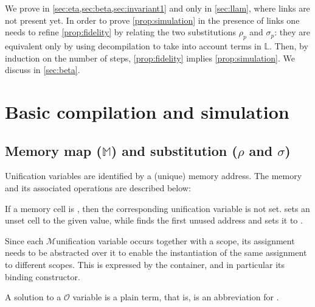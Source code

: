 \documentclass[sigconf,natbib=false,review]{acmart}
\newcommand{\Fo}{\texorpdfstring{\ensuremath{\mathcal{O}\xspace}}{O}} %
\newcommand{\Ho}{\texorpdfstring{\ensuremath{\mathcal{M}}\xspace}{M}}
\newcommand{\linkStore}{\texorpdfstring{\ensuremath{\mathbb{L}}\xspace}{L}}
\newcommand{\mapStore}{\texorpdfstring{\ensuremath{\mathbb{M}}\xspace}{M}}
\begin{document}
We prove  in
\cref{sec:eta,sec:beta,sec:invariant1}
and  only in \cref{sec:llam},
where links are not present yet.
In order to prove \cref{prop:simulation} in the presence of links
one needs to refine \cref{prop:fidelity} by relating the two
substitutions $\rho_p$ and $\sigma_p$: they are equivalent only by using decompilation to 
take into account terms in \linkStore.
Then, by induction
on the number of steps, \cref{prop:fidelity} implies \cref{prop:simulation}.
We discuss  in \cref{sec:beta}.


\section{Basic compilation and simulation}
\label{sec:simulation}


\subsection{Memory map (\mapStore) and substitution (\texorpdfstring{$\rho$ and $\sigma$}{rho and sigma})}
\label{sec:grounwork}


% 

Unification variables are identified by a (unique) memory address.
The memory and its associated operations are described below:



\noindent
If a memory cell is , then the corresponding unification variable
is not set.  sets an unset cell to the given value, while
 finds the first unused address and sets it to .

Since each \Ho unification variable occurs together with a scope,
its assignment needs to be abstracted over it to enable the
instantiation of the same assignment to different scopes.
This is expressed by the  container, and in particular
its  binding constructor.



\noindent
A solution to a \Fo{} variable is a plain term, that is, 
is an abbreviation for .
\end{document}
